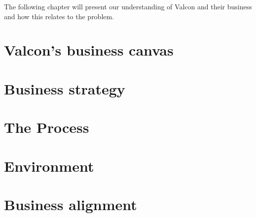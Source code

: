 The following chapter will present our understanding of Valcon and their business and how this relates to the problem.

\section{Valcon's business canvas}

\section{Business strategy}

\section{The Process}

\section{Environment}

\section{Business alignment}
